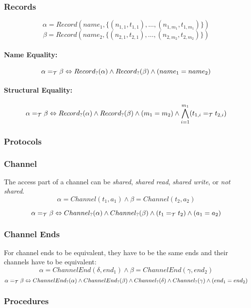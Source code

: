 \documentclass[]{article}
\begin{document}
\subsubsection{Records}

\[
\alpha = Record(name_1, \{(n_{1,1},t_{1,1}),\ldots,(n_{1,m_1}, t_{1,m_1})\})
\]
\[
\beta = Record(name_2, \{(n_{2,1},t_{2,1}),\ldots,(n_{2,m_2}, t_{2,m_2})\})
\]
\paragraph{Name Equality:}
\[
\alpha =_{\cal T} \beta \Leftrightarrow Record_?(\alpha) \wedge Record_?(\beta) \wedge (name_1 = name_2)
\]
\paragraph{Structural Equality:}
\[
\alpha =_{\cal T} \beta \Leftrightarrow Record_?(\alpha) \wedge Record_?(\beta) \wedge (m_1 = m_2) \wedge \bigwedge^{m_1}_{i=1} (t_{1,i} =_{\cal T} t_{2,i})
\]
	
\subsubsection{Protocols}

\subsubsection{Channel}

The access part of a channel can be {\it shared}, {\it shared read}, {\it shared write}, or {\it not shared}. 
\
\[
\alpha = Channel(t_1, a_1) \wedge \beta = Channel(t_2, a_2)\]

\[
\alpha =_{\cal T} \beta \Leftrightarrow Channel_?(\alpha) \wedge Channel_?(\beta) \wedge (t_1 =_{\cal T} t_2) \wedge (a_1 = a_2)
\]

\subsubsection{Channel Ends}

For channel ends to be equivalent, they have to be the same ends and their channels have to be equivalent:
\[
\alpha = ChannelEnd(\delta, end_1) \wedge \beta = ChannelEnd(\gamma, end_2)
\]
\[
\alpha =_{\cal T} \beta \Leftrightarrow ChannelEnd_?(\alpha) \wedge ChannelEnd_?(\beta) \wedge Channel_?(\delta) \wedge Channel_?(\gamma) \wedge (end_1 = end_2)
\]

\subsubsection{Procedures}
\end{document}
